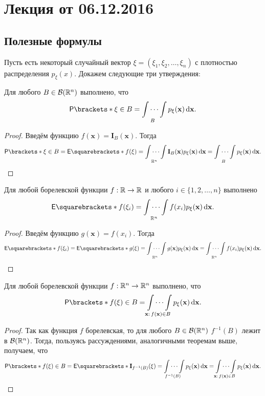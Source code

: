 \section{Лекция от 06.12.2016}

\subsection{Полезные формулы}
Пусть есть некоторый случайный вектор \(\xi = (\xi_1, \xi_2, \dots, \xi_n)\) с плотностью распределения \(p_{\xi}(x)\). Докажем следующие три утверждения:
\begin{theorem}
	Для любого \(B \in \mathcal{B}(\mathbb{R}^n)\) выполнено, что
	\[
	\Pr{\xi \in B} = \idotsint\limits_{B} p_{\xi}(\mathbf{x}) \diff\mathbf{x}.
	\]
\end{theorem}
\begin{proof}
	Введём функцию \(f(\mathbf{x}) = \mathbf{I}_{B}(\mathbf{x})\). Тогда
	\[
	\Pr{\xi \in B} =\E{f(\xi)} = \idotsint\limits_{\R^n} \mathbf{I}_{B}(\mathbf{x})p_{\xi}(\mathbf{x}) \diff\mathbf{x} = \idotsint\limits_{B} p_{\xi}(\mathbf{x}) \diff\mathbf{x}.\qedhere
	\]
\end{proof}

\begin{theorem}
	Для любой борелевской функции \(f : \mathbb{R} \to \mathbb{R}\) и любого \(i \in \{1, 2, \dots, n\}\) выполнено
	\[
	\E{f(\xi_i)} = \idotsint\limits_{\R^n} f(x_i)p_{\xi}(\mathbf{x}) \diff\mathbf{x}.
	\]
\end{theorem}
\begin{proof}
	Введём функцию \(g(\mathbf{x}) = f(x_i)\). Тогда
	\[
	\E{f(\xi_i)} = \E{g(\xi)} = \idotsint\limits_{\R^n} g(\mathbf{x})p_{\xi}(\mathbf{x}) \diff\mathbf{x} = \idotsint\limits_{\R^n} f(x_i)p_{\xi}(\mathbf{x}) \diff\mathbf{x}.\qedhere
	\]
\end{proof}
\begin{theorem}
	Для любой борелевской функции \(f : \mathbb{R}^n \to \mathbb{R}^n\) выполнено, что
	\[
	\Pr{f(\xi) \in B} = \idotsint\limits_{\mathbf{x}:\,f(\mathbf{x}) \in B} p_{\xi}(\mathbf{x}) \diff\mathbf{x}.
	\]
\end{theorem}
\begin{proof}
	Так как функция \(f\) борелевская, то для любого \(B \in \mathcal{B}(\mathbb{R}^n)\) \(f^{-1}(B)\) лежит в \(\mathcal{B}(\mathbb{R}^n)\). Тогда, пользуясь рассуждениями, аналогичными теоремам выше, получаем, что
	\[
	\Pr{f(\xi) \in B} = \E{\mathbf{I}_{f^{-1}(B)}(\xi)} =  \idotsint\limits_{f^{-1}(B)} p_{\xi}(\mathbf{x}) \diff\mathbf{x} = \idotsint\limits_{\mathbf{x}:\,f(\mathbf{x}) \in B} p_{\xi}(\mathbf{x}) \diff\mathbf{x}.\qedhere
	\]
\end{proof}

